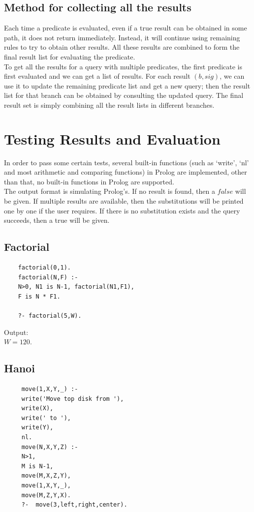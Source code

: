 \documentclass[11pt,a4paper]{report}
\begin{document}
\subsection*{Method for collecting all the results}
Each time a predicate is evaluated, even if a true result can be obtained in some path, it does not return immediately. Instead, it will continue using remaining rules to try to obtain other results. All these results are combined to form the final result list for evaluating the predicate.\\
To get all the results for a query with multiple predicates, the first predicate is first evaluated and we can get a list of results. For each result $(b,sig)$, we can use it to update the remaining predicate list and get a new query; then the result list for that branch can be obtained by consulting the updated query. The final result set is simply combining all the result lists in different branches. 


\section*{Testing Results and Evaluation}
In order to pass some certain tests, several built-in functions (such as `write', `nl' and most arithmetic and comparing functions) in Prolog are implemented, other than that, no built-in functions in Prolog are supported.\\

The output format is simulating Prolog's. If no result is found, then a $false$ will be given.
If multiple results are available, then the substitutions will be printed one by one if the user requires. If there is no substitution exists and the query succeeds, then a true will be given.

\subsection*{Factorial}
\begin{lstlisting}
	factorial(0,1). 
	factorial(N,F) :- 
	N>0, N1 is N-1, factorial(N1,F1),
	F is N * F1. 
	
	?- factorial(5,W).
\end{lstlisting}
Output:\\
$W=120.$


\subsection*{Hanoi}
\begin{lstlisting}
	 move(1,X,Y,_) :-  
	 write('Move top disk from '), 
	 write(X), 
	 write(' to '), 
	 write(Y), 
	 nl. 
	 move(N,X,Y,Z) :- 
	 N>1, 
	 M is N-1, 
	 move(M,X,Z,Y), 
	 move(1,X,Y,_), 
	 move(M,Z,Y,X).  
	 ?-  move(3,left,right,center). 
\end{lstlisting}
\end{document}

